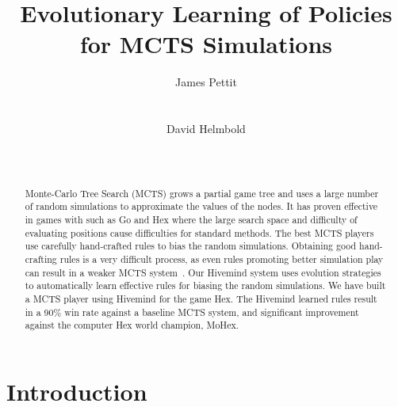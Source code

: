 \documentclass{acm_proc_article-sp}
\title{Evolutionary Learning of Policies for MCTS Simulations}
\author{ 
\alignauthor
James Pettit \\
       \affaddr{U.C. Santa Cruz}\\
       \affaddr{Santa Cruz, California}\\
       \email{ jpettit@soe.ucsc.edu}
\alignauthor
David Helmbold \\
       \affaddr{U.C. Santa Cruz}\\
       \affaddr{Santa Cruz, California}\\
       \email{dph@soe.ucsc.edu}
}
\begin{document}

\maketitle


\begin{abstract}
Monte-Carlo Tree Search (MCTS) 
grows a partial game tree and uses a large number of random simulations to
approximate the values of the nodes.   
It has proven effective in games with such as Go and Hex where the large search space and
difficulty of evaluating positions cause difficulties for standard methods.
The best MCTS players use carefully hand-crafted rules to bias the random simulations.
Obtaining good  hand-crafting rules is a very difficult process, as even rules promoting better
simulation play can result in a weaker MCTS system~\cite{gelly2006modification}.
Our Hivemind system uses evolution strategies to automatically learn effective rules for biasing the 
random simulations.
We have built a MCTS player using Hivemind for the game Hex. 
The Hivemind learned rules result in a 90\% win rate against a baseline MCTS system, and 
significant improvement against the computer Hex world champion, MoHex.
\end{abstract}



\section{Introduction}
\end{document}
